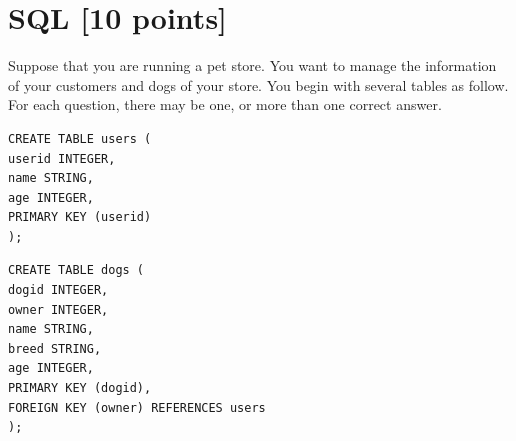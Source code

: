 \documentclass[10pt]{article}
\begin{document}


\newpage
\section{SQL \textbf{[10 points]}}
Suppose that you are running a pet store. You want to manage the information of your customers and dogs of your store. 
You begin with several tables as follow. For each question, there may be one, or more than one correct answer.
\begin{verbatim}
CREATE TABLE users (
userid INTEGER,
name STRING,
age INTEGER,
PRIMARY KEY (userid)
);
\end{verbatim}

\begin{verbatim}
CREATE TABLE dogs (
dogid INTEGER,
owner INTEGER,
name STRING,
breed STRING,
age INTEGER,
PRIMARY KEY (dogid),
FOREIGN KEY (owner) REFERENCES users
);
\end{verbatim}
\end{document}
